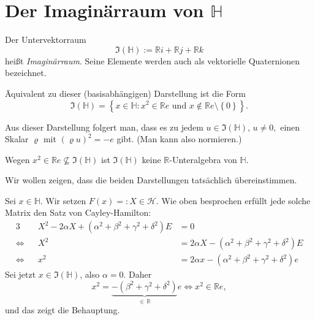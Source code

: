 \documentclass[aspectratio=169]{beamer}
\newcommand{\Ham}{\ensuremath{\mathbb{H}}{ }}
\newcommand{\R}{\ensuremath{\mathbb{R}}{ }}
\begin{document}
    \section{Der Imaginärraum von \(\mathbb{H}\)}
    \begin{frame}
        \begin{definition}
            Der Untervektorraum
            \[
                \Im(\Ham) := \R i + \R j + \R k
            \]
            heißt \emph{Imaginärraum}.
            Seine Elemente werden auch als vektorielle Quaternionen bezeichnet.

            Äquivalent zu dieser (basisabhängigen) Darstellung ist die Form
            \[
                \Im(\Ham) = \left\{ x \in \Ham \colon x^2 \in \R e \text{ und } x \notin \R e \setminus \left\{ 0 \right\} \right\}
            .\] 
        \end{definition}

        Aus dieser Darstellung folgert man, dass es zu jedem \(u \in \Im(\Ham), \, u \neq 0,\) einen Skalar \(\varrho\) mit \((\varrho u)^2 = - e\) gibt.
        (Man kann also normieren.)

        Wegen \(x^2 \in \R e \nsubseteq \Im(\Ham)\) ist \(\Im(\Ham)\) keine \(\R\)-Unteralgebra von \(\Ham\).
    \end{frame}

    \begin{frame}
        Wir wollen zeigen, dass die beiden Darstellungen tatsächlich übereinstimmen.

        Sei \(x \in \Ham\).
        Wir setzen \(F(x) =: X \in \mathcal{H}\).
        Wie oben besprochen erfüllt jede solche Matrix den Satz von Cayley-Hamilton:
        \begin{alignat*}{3}
                 &&X^2 - 2 \alpha X + \left( \alpha^2 + \beta^2 + \gamma^2 + \delta^2 \right) E &= 0 \\
            \iff &&X^2 &= 2 \alpha X - \left( \alpha^2 + \beta^2 + \gamma^2 + \delta^2 \right) E \\
            \iff &&x^2 &= 2 \alpha x - \left( \alpha^2 + \beta^2 + \gamma^2 + \delta^2 \right) e
        \end{alignat*}
        Sei jetzt \(x \in \Im(\Ham)\), also \(\alpha = 0\).
        Daher
        \[
            x^2 = \underbrace{- \left( \beta^2 + \gamma^2 + \delta^2 \right)}_{\in \, \R} e \iff x^2 \in \R e
        ,\] 
        und das zeigt die Behauptung.
    \end{frame}
\end{document}
